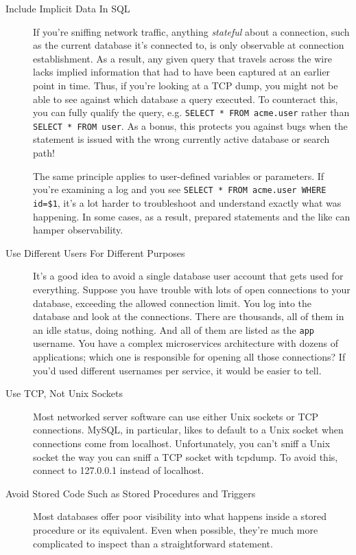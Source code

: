 \documentclass{vivid_layout}
\begin{document}
\begin{description}

\item[Include Implicit Data In SQL]
If you're sniffing network traffic, anything \emph{stateful} about
a connection, such as the current database it's connected to, is only observable at
connection establishment. As a result, any given query that travels across the wire 
lacks implied information that had to have been captured at an earlier point
in time. Thus, if you're looking at a TCP dump, you might not be able to see
against which database a query executed. To counteract this, you can fully
qualify the query, e.g. \texttt{SELECT * FROM acme.user} rather than
\texttt{SELECT * FROM user}. As a bonus, this protects you against bugs when the
statement is issued with the wrong currently active database or search path!

The same principle applies to user-defined variables or parameters. If you're
examining a log and you see \texttt{SELECT * FROM acme.user WHERE id=\$1}, it's a
lot harder to troubleshoot and understand exactly what was happening. In some
cases, as a result, prepared statements and the like can hamper observability.

\item[Use Different Users For Different Purposes] It's a good idea to
avoid a single database user account that gets used for everything. Suppose you
have trouble with lots of open connections to your database, exceeding the
allowed connection limit. You log into the database and look at the connections.
There are thousands, all of them in an idle status, doing nothing. And all of
them are listed as the \texttt{app} username. You have a complex microservices
architecture with dozens of applications; which one is responsible for opening
all those connections? If you'd used different usernames per service, it would be
easier to tell.

\item[Use TCP, Not Unix Sockets] Most networked server software can use either
Unix sockets or TCP connections. MySQL, in particular, likes to default to a
Unix socket when connections come from localhost. Unfortunately, you can't sniff
a Unix socket the way you can sniff a TCP socket with tcpdump. To avoid this,
connect to 127.0.0.1 instead of localhost.

\item[Avoid Stored Code Such as Stored Procedures and Triggers] Most databases
offer poor visibility into what happens inside a stored procedure or its
equivalent. Even when possible, they're much more complicated to inspect 
than a straightforward statement.

\end{description}
\end{document}
